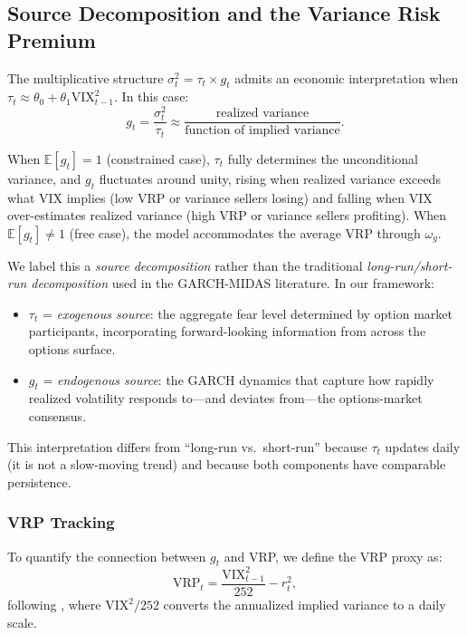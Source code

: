 \documentclass[12pt,a4paper]{article}
\newcommand{\E}{\mathbb{E}}
\begin{document}
\subsection{Source Decomposition and the Variance Risk Premium}
\label{sec:vrp}

The multiplicative structure $\sigma_t^2 = \tau_t \times g_t$ admits an economic interpretation when $\tau_t \approx \theta_0 + \theta_1 \mathrm{VIX}_{t-1}^2$. In this case:
\begin{equation}
g_t = \frac{\sigma_t^2}{\tau_t} \approx \frac{\text{realized variance}}{\text{function of implied variance}}.
\label{eq:g_vrp}
\end{equation}

When $\E[g_t] = 1$ (constrained case), $\tau_t$ fully determines the unconditional variance, and $g_t$ fluctuates around unity, rising when realized variance exceeds what VIX implies (low VRP or variance sellers losing) and falling when VIX over-estimates realized variance (high VRP or variance sellers profiting). When $\E[g_t] \neq 1$ (free case), the model accommodates the average VRP through $\omega_g$.

We label this a \emph{source decomposition} rather than the traditional \emph{long-run/short-run decomposition} used in the GARCH-MIDAS literature. In our framework:
\begin{itemize}
\item $\tau_t$ = \emph{exogenous source}: the aggregate fear level determined by option market participants, incorporating forward-looking information from across the options surface.
\item $g_t$ = \emph{endogenous source}: the GARCH dynamics that capture how rapidly realized volatility responds to---and deviates from---the options-market consensus.
\end{itemize}

This interpretation differs from ``long-run vs.\ short-run'' because $\tau_t$ updates daily (it is not a slow-moving trend) and because both components have comparable persistence.

\subsubsection{VRP Tracking}

To quantify the connection between $g_t$ and VRP, we define the VRP proxy as:
\begin{equation}
\mathrm{VRP}_t = \frac{\mathrm{VIX}_{t-1}^2}{252} - r_t^2,
\label{eq:vrp_proxy}
\end{equation}
following \citet{bollerslev2009}, where $\mathrm{VIX}^2/252$ converts the annualized implied variance to a daily scale.
\end{document}
